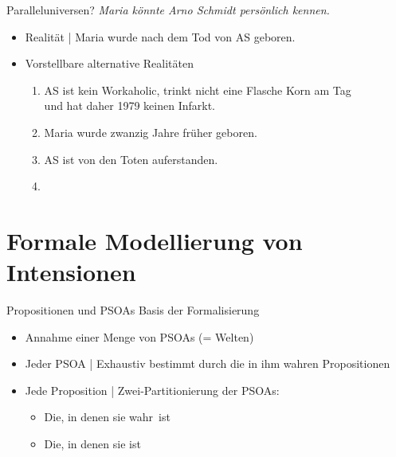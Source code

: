 \begin{frame}
  {Paralleluniversen?}
  \onslide<+->
  \onslide<+->
  \alert{\textit{Maria könnte Arno Schmidt persönlich kennen.}}\\
  \Zeile
  \begin{itemize}[<+->]
    \item Realität | Maria wurde nach dem Tod von AS geboren.
      \Halbzeile
    \item Vorstellbare alternative Realitäten
      \begin{enumerate}[<+->]
        \item AS ist kein Workaholic, trinkt nicht eine Flasche Korn am Tag\\
          und hat daher 1979 keinen Infarkt.
        \item Maria wurde zwanzig Jahre früher geboren.
        \item AS ist von den Toten auferstanden.
        \item {}
      \end{enumerate}
  \end{itemize}
\end{frame}

\section{Formale Modellierung von Intensionen}

\begin{frame}
  {Propositionen und PSOAs}
  \onslide<+->
  \onslide<+->
  Basis der Formalisierung\\
  \Halbzeile
  \begin{itemize}[<+->]
    \item Annahme einer \alert{Menge von PSOAs} (= Welten)
      \Halbzeile
    \item Jeder PSOA | Exhaustiv bestimmt durch die in ihm wahren Propositionen
      \Halbzeile
    \item Jede Proposition | Zwei-Partitionierung der PSOAs:
      \begin{itemize}[<+->]
        \item Die, in denen sie \alert{wahr} ist
        \item Die, in denen sie  ist
      \end{itemize}
  \end{itemize}
\end{frame}

